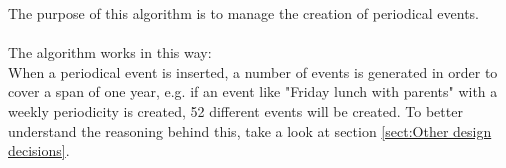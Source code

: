 The purpose of this algorithm is to manage the creation of periodical events. \\ \\
The algorithm works in this way: \\
When a periodical event is inserted, a number of events is generated in order to cover a span of one year, e.g. if an event like "Friday lunch with parents" with a weekly periodicity is created, 52 different events will be created.
To better understand the reasoning behind this, take a look at section \ref{sect:Other design decisions}.
